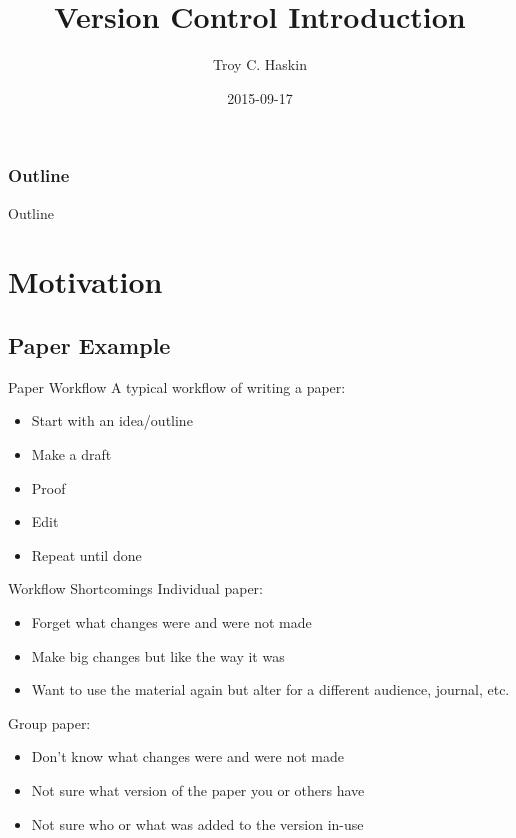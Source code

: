 \documentclass[10pt,t,xcolor=table]{UWMadBeamer}
\title{Version Control Introduction}
\institute{University of Wisconsin--Madison}
\author{Troy C. Haskin}
\date{2015-09-17}
\newenvironment{Itemize}
    {\begin{itemize}\setlength{\itemsep}{0.50em}\setlength{\leftmargin}{0.0em}\setlength{\labelwidth}{0em}}
    {\end{itemize}}
\begin{document}
\begin{frame}
    \frametitle{Outline}
    \titlepage
\end{frame}


\begin{frame}{Outline}
    \tableofcontents
\end{frame}



\section{Motivation}

    \subsection{Paper Example}

    \begin{frame}{Paper Workflow}
        A typical workflow of writing a paper:
        \begin{Itemize}
            \item{Start with an idea/outline}
            \item{Make a draft}
            \item{Proof}
            \item{Edit}
            \item{Repeat until done}
        \end{Itemize}
    \end{frame}

    \begin{frame}{Workflow Shortcomings}
        Individual paper:
        \begin{Itemize}
            \item{Forget what changes were and were not made}
            \item{Make big changes but like the way it was}
            \item{Want to use the material again but alter for a different audience, journal, etc.}
        \end{Itemize}
        
        Group paper:
        \begin{Itemize}
            \item{Don't know what changes were and were not made}
            \item{Not sure what version of the paper you or others have}
            \item{Not sure who or what was added to the version in-use}
        \end{Itemize}
    \end{frame}
\end{document}
